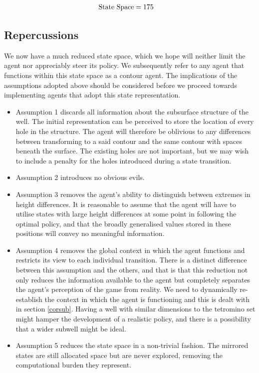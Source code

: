\documentclass{rucsthesis}
\begin{document}
\begin{eqnarray*}
\centering
\textrm{State Space} & = 175
\end{eqnarray*}

\subsection*{Repercussions}

We now have a much reduced state space, which we hope will neither limit the agent nor appreciably steer its policy. We subsequently refer to any agent that functions within this state space as a contour agent. The implications of the assumptions adopted above should be considered before we proceed towards implementing agents that adopt this state representation.

\begin{itemize}
\item{Assumption 1 discards all information about the subsurface structure of the well. The initial representation can be perceived to store the location of every hole in the structure. The agent will therefore be oblivious to any differences between transforming to a said contour and the same contour with spaces beneath the surface. The existing holes are not important, but we may wish to include a penalty for the holes introduced during a state transition.}
\item{Assumption 2 introduces no obvious evils.}
\item{Assumption 3 removes the agent's ability to distinguish between extremes in height differences. It is reasonable to assume that the agent will have to utilise states with large height differences at some point in following the optimal policy, and that the broadly generalised values stored in these positions will convey no meaningful information. }%
\item{Assumption 4 removes the global context in which the agent functions and restricts its view to each individual transition. There is a distinct difference between this assumption and the others, and that is that this reduction not only reduces the information available to the agent but completely separates the agent's perception of the game from reality. We need to dynamically re-establish the context in which the agent is functioning and this is dealt with in section \ref{corsub}. Having a well with similar dimensions to the tetromino set might hamper the development of a realistic policy, and there is a possibility that a wider subwell might be ideal.}
\item{Assumption 5 reduces the state space in a non-trivial fashion. The mirrored states are still allocated space but are never explored, removing the computational burden they represent.}
\end{itemize}
\end{document}
